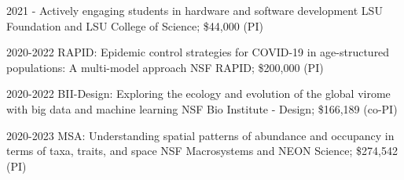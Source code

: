 \documentclass[]{CV}
\begin{document}
\begin{entrylist}










 \entry
 {2021 - }
 {Actively engaging students in hardware and software development}
 {LSU Foundation and LSU College of Science; \$44,000 (PI)}

 \entry
 {2020-2022}
 {RAPID: Epidemic control strategies for COVID-19 in age-structured populations: A multi-model approach }
 {NSF RAPID; \$200,000 (PI)}

 \entry
 {2020-2022}
 {BII-Design: Exploring the ecology and evolution of the global virome with big data and machine learning}
 {NSF Bio Institute - Design; \$166,189 (co-PI)}

 \entry
 {2020-2023}
 {MSA: Understanding spatial patterns of abundance and occupancy in terms of taxa, traits, and space}
 {NSF Macrosystems and NEON Science; \$274,542 (PI)}


\end{entrylist}







\end{document}
